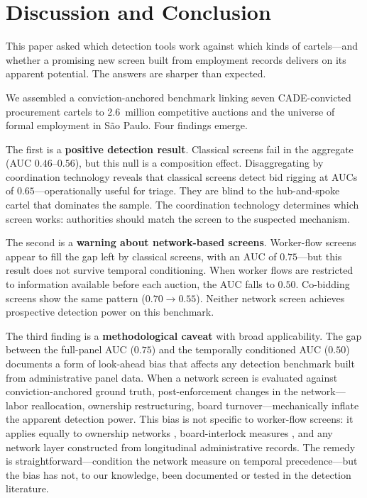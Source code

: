 \section{Discussion and Conclusion}\label{concl}

This paper asked which detection tools work against which kinds of cartels---and whether a promising new screen built from employment records delivers on its apparent potential. The answers are sharper than expected.

We assembled a conviction-anchored benchmark linking seven CADE-convicted procurement cartels to 2.6~million competitive auctions and the universe of formal employment in S\~{a}o Paulo. Four findings emerge.

The first is a \textbf{positive detection result}. Classical screens fail in the aggregate (AUC $0.46$--$0.56$), but this null is a composition effect. Disaggregating by coordination technology reveals that classical screens detect bid rigging at AUCs of $0.65$---operationally useful for triage. They are blind to the hub-and-spoke cartel that dominates the sample. The coordination technology determines which screen works: authorities should match the screen to the suspected mechanism.

The second is a \textbf{warning about network-based screens}. Worker-flow screens appear to fill the gap left by classical screens, with an AUC of $0.75$---but this result does not survive temporal conditioning. When worker flows are restricted to information available before each auction, the AUC falls to $0.50$. Co-bidding screens show the same pattern ($0.70 \to 0.55$). Neither network screen achieves prospective detection power on this benchmark.

The third finding is a \textbf{methodological caveat} with broad applicability. The gap between the full-panel AUC ($0.75$) and the temporally conditioned AUC ($0.50$) documents a form of look-ahead bias that affects any detection benchmark built from administrative panel data. When a network screen is evaluated against conviction-anchored ground truth, post-enforcement changes in the network---labor reallocation, ownership restructuring, board turnover---mechanically inflate the apparent detection power. This bias is not specific to worker-flow screens: it applies equally to ownership networks \citep{asai2026ownership}, board-interlock measures \citep{herrera2025collusion}, and any network layer constructed from longitudinal administrative records. The remedy is straightforward---condition the network measure on temporal precedence---but the bias has not, to our knowledge, been documented or tested in the detection literature.

